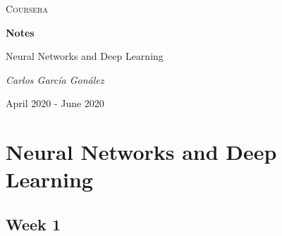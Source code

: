 \documentclass[11pt]{report}
\makeatletter
\renewcommand\tableofcontents{
  \null\hfill\textbf{\Large\contentsname}\hfill\null\par
  \@mkboth{\MakeUppercase\contentsname}{\MakeUppercase\contentsname}
  \@starttoc{toc}
}
\makeatother
\begin{document}
\begin{titlepage}
	\centering
	{\scshape\LARGE Coursera \par}
	\vspace{6.5cm}
	{\LARGE \textbf{Notes}\par}
	{\LARGE Neural Networks and Deep Learning \par}
	\vfill
	{\Large\itshape Carlos Garc\'ia Gon\'alez\par}
	\vspace{1cm}
	{\large April 2020 - June 2020 \par}
\end{titlepage}

\tableofcontents
{}
\newpage
\chapter{Neural Networks and Deep Learning}

\section{Week 1}
\end{document}

